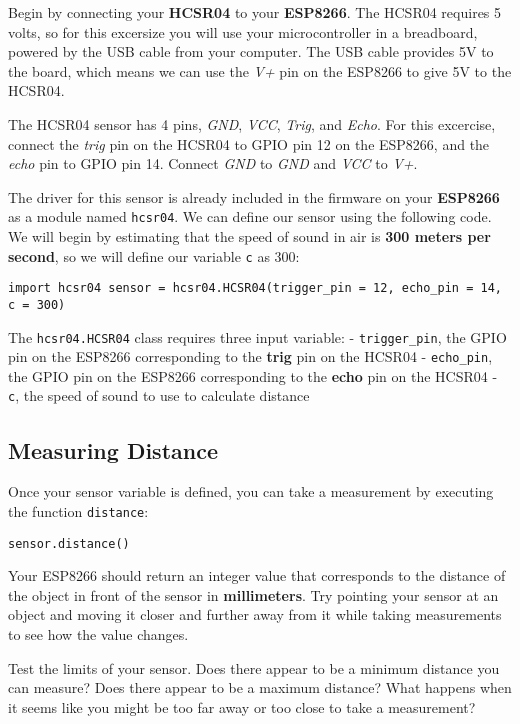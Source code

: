 \documentclass[11pt]{article}
\begin{document}
Begin by connecting your \textbf{HCSR04} to your \textbf{ESP8266}. The
HCSR04 requires 5 volts, so for this excersize you will use your
microcontroller in a breadboard, powered by the USB cable from your
computer. The USB cable provides 5V to the board, which means we can use
the \emph{V+} pin on the ESP8266 to give 5V to the HCSR04.

The HCSR04 sensor has 4 pins, \emph{GND}, \emph{VCC}, \emph{Trig}, and
\emph{Echo}. For this excercise, connect the \emph{trig} pin on the
HCSR04 to GPIO pin 12 on the ESP8266, and the \emph{echo} pin to GPIO
pin 14. Connect \emph{GND} to \emph{GND} and \emph{VCC} to \emph{V+}.

The driver for this sensor is already included in the firmware on your
\textbf{ESP8266} as a module named \texttt{hcsr04}. We can define our
sensor using the following code. We will begin by estimating that the
speed of sound in air is \textbf{300 meters per second}, so we will
define our variable \texttt{c} as 300:

\texttt{import\ hcsr04\ sensor\ =\ hcsr04.HCSR04(trigger\_pin\ =\ 12,\ echo\_pin\ =\ 14,\ c\ =\ 300)}

The \texttt{hcsr04.HCSR04} class requires three input variable: -
\texttt{trigger\_pin}, the GPIO pin on the ESP8266 corresponding to the
\textbf{trig} pin on the HCSR04 - \texttt{echo\_pin}, the GPIO pin on
the ESP8266 corresponding to the \textbf{echo} pin on the HCSR04 -
\texttt{c}, the speed of sound to use to calculate distance

\hypertarget{measuring-distance}{%
\subsection{Measuring Distance}\label{measuring-distance}}

Once your sensor variable is defined, you can take a measurement by
executing the function \texttt{distance}:

\texttt{sensor.distance()}

Your ESP8266 should return an integer value that corresponds to the
distance of the object in front of the sensor in \textbf{millimeters}.
Try pointing your sensor at an object and moving it closer and further
away from it while taking measurements to see how the value changes.

Test the limits of your sensor. Does there appear to be a minimum
distance you can measure? Does there appear to be a maximum distance?
What happens when it seems like you might be too far away or too close
to take a measurement?
\end{document}
